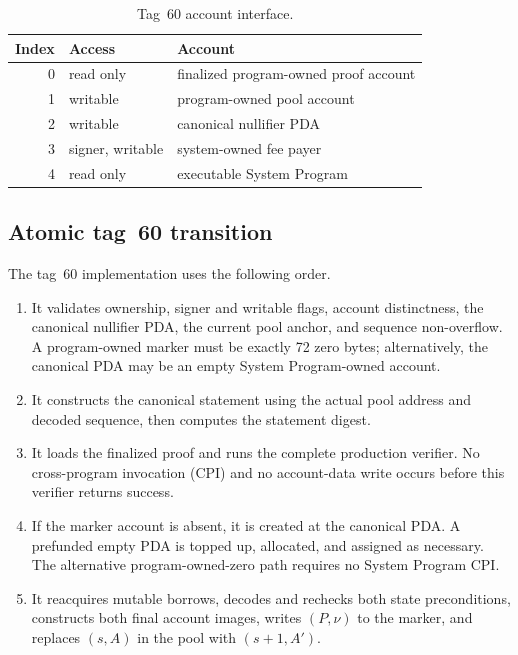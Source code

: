 \begin{table}[t]
  \centering
  \small
  \caption{Tag~60 account interface.}
  \label{tab:tag60-accounts}
  \begin{tabular}{r l l}
    \toprule
    Index & Access & Account \\
    \midrule
    0 & read only       & finalized program-owned proof account \\
    1 & writable        & program-owned pool account \\
    2 & writable        & canonical nullifier PDA \\
    3 & signer, writable& system-owned fee payer \\
    4 & read only       & executable System Program \\
    \bottomrule
  \end{tabular}
\end{table}

\subsection{Atomic tag~60 transition}
\label{sec:implementation-atomic}

The tag~60 implementation uses the following order.
\begin{enumerate}
  \item It validates ownership, signer and writable flags, account
  distinctness, the canonical nullifier PDA, the current pool anchor, and
  sequence non-overflow.  A program-owned marker must be exactly 72 zero
  bytes; alternatively, the canonical PDA may be an empty System
  Program-owned account.
  \item It constructs the canonical statement using the actual pool address
  and decoded sequence, then computes the statement digest.
  \item It loads the finalized proof and runs the complete production
  \Profile{} verifier.  No cross-program invocation (CPI) and no account-data
  write occurs before this
  verifier returns success.
  \item If the marker account is absent, it is created at the canonical PDA\@.
  A prefunded empty PDA is topped up, allocated, and assigned as necessary.
  The alternative program-owned-zero path requires no System Program CPI\@.
  \item It reacquires mutable borrows, decodes and rechecks both state
  preconditions, constructs both final account images, writes
  \((P,\nu)\) to the marker, and replaces \((s,A)\) in the pool with
  \((s+1,A')\).
\end{enumerate}

